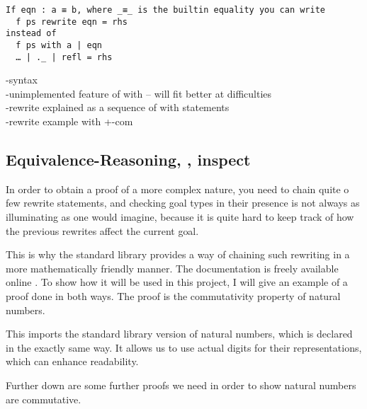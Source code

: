 \documentclass[12pt,twoside,notitlepage]{report}
\newcommand{\Conid}[1]{\mathit{#1}}
\newcommand{\Varid}[1]{\mathit{#1}}
\def\resethooks{%
  \global\let\SaveRestoreHook\empty
  \global\let\ColumnHook\empty}
\let\hspre\empty
\let\hspost\empty
\begin{document}
\begin{verbatim}
If eqn : a ≡ b, where _≡_ is the builtin equality you can write
  f ps rewrite eqn = rhs
instead of
  f ps with a | eqn
  … | ._ | refl = rhs
\end{verbatim}

-syntax\\
-unimplemented feature of with -- will fit better at difficulties\\
-rewrite explained as a sequence of with statements\\
-rewrite example with +-com

\subsection{Equivalence-Reasoning, , inspect}

In order to obtain a proof of a more complex nature, you need to chain quite o few rewrite statements, and checking goal
types in their presence is not always as illuminating as one would imagine, because it is quite hard to keep track of
how the previous rewrites affect the current goal.

This is why the standard library provides a way of chaining such rewriting in a more mathematically friendly manner.
The documentation is freely available online \cite{agdadoc}. To show how it will be used in this project,
I will give an example of a proof done in both ways. The proof is the commutativity property of natural numbers.

\begin{hscode}\SaveRestoreHook
\column{B}{@{}>{\hspre}l<{\hspost}@{}}%
\column{3}{@{}>{\hspre}l<{\hspost}@{}}%
\column{E}{@{}>{\hspre}l<{\hspost}@{}}%
\>[3]{}\Varid{open}\;\;\Conid{\Conid{Data}.Nat}{}\<[E]%
\ColumnHook
\end{hscode}\resethooks

  This imports the standard library version of natural numbers, which is declared in the exactly same way.
  It allows us to use actual digits for their representations, which can enhance readability.

  Further down are some further proofs we need in order to show natural numbers are commutative.
\end{document}
